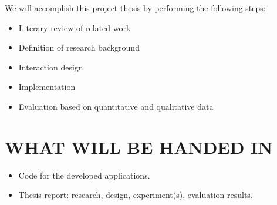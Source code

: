 We will accomplish this project thesis by performing the following steps:
\begin{itemize}
\item{Literary review of related work}
\item{Definition of research background}
\item{Interaction design}
\item{Implementation}
\item{Evaluation based on quantitative and qualitative data}
\end{itemize}

\section{WHAT WILL BE HANDED IN}

\begin{itemize}
\item{Code for the developed applications.}
\item{Thesis report: research, design, experiment(s), evaluation results.}
\end{itemize}